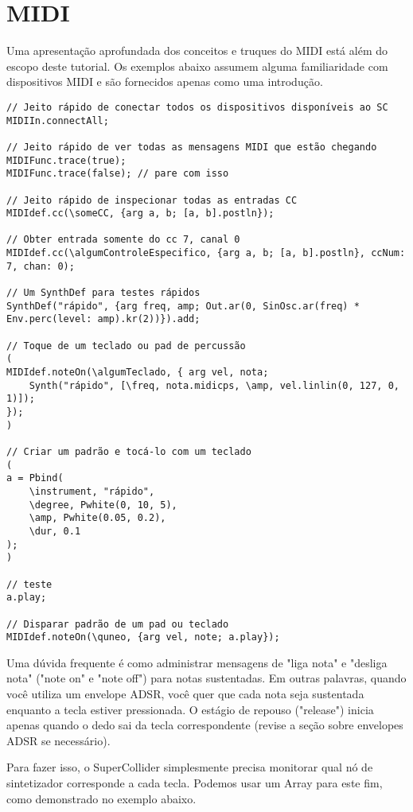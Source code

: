 \section{MIDI}

Uma apresentação aprofundada dos conceitos e truques do MIDI está além do escopo deste tutorial. Os exemplos abaixo assumem alguma familiaridade com dispositivos MIDI e são fornecidos apenas como uma introdução.


\begin{lstlisting}[style=SuperCollider-IDE, basicstyle=\scttfamily\footnotesize]
// Jeito rápido de conectar todos os dispositivos disponíveis ao SC
MIDIIn.connectAll;

// Jeito rápido de ver todas as mensagens MIDI que estão chegando
MIDIFunc.trace(true);
MIDIFunc.trace(false); // pare com isso

// Jeito rápido de inspecionar todas as entradas CC
MIDIdef.cc(\someCC, {arg a, b; [a, b].postln});

// Obter entrada somente do cc 7, canal 0
MIDIdef.cc(\algumControleEspecifico, {arg a, b; [a, b].postln}, ccNum: 7, chan: 0);

// Um SynthDef para testes rápidos
SynthDef("rápido", {arg freq, amp; Out.ar(0, SinOsc.ar(freq) * Env.perc(level: amp).kr(2))}).add;

// Toque de um teclado ou pad de percussão
(
MIDIdef.noteOn(\algumTeclado, { arg vel, nota;
	Synth("rápido", [\freq, nota.midicps, \amp, vel.linlin(0, 127, 0, 1)]);
});
)

// Criar um padrão e tocá-lo com um teclado
(
a = Pbind(
	\instrument, "rápido",
	\degree, Pwhite(0, 10, 5),
	\amp, Pwhite(0.05, 0.2),
	\dur, 0.1
);
)

// teste
a.play;

// Disparar padrão de um pad ou teclado
MIDIdef.noteOn(\quneo, {arg vel, note; a.play});
\end{lstlisting}

Uma dúvida frequente é como administrar mensagens de "liga nota" e "desliga nota" ("note on" e "note off") para notas sustentadas. Em outras palavras, quando você utiliza um envelope ADSR, você quer que cada nota seja sustentada enquanto a tecla estiver pressionada. O estágio de repouso ("release") inicia apenas quando o dedo sai da tecla correspondente (revise a seção sobre envelopes ADSR se necessário).

Para fazer isso, o SuperCollider simplesmente precisa monitorar qual nó de sintetizador corresponde a cada tecla. Podemos usar um Array para este fim, como demonstrado no exemplo abaixo. 

